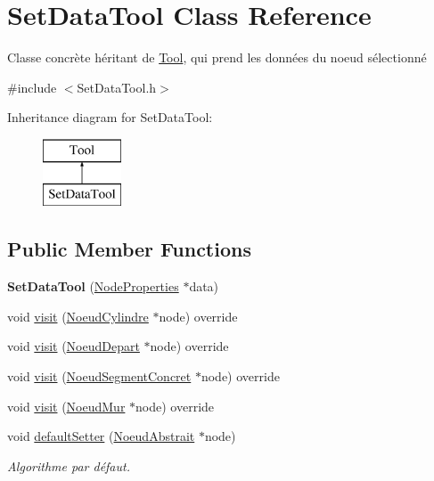 \hypertarget{class_set_data_tool}{}\section{Set\+Data\+Tool Class Reference}
\label{class_set_data_tool}


Classe concrète héritant de \hyperlink{class_tool}{Tool}, qui prend les données du noeud sélectionné  




{\ttfamily \#include $<$Set\+Data\+Tool.\+h$>$}

Inheritance diagram for Set\+Data\+Tool\+:\begin{figure}[H]
\begin{center}
\leavevmode
\includegraphics[height=2.000000cm]{class_set_data_tool}
\end{center}
\end{figure}
\subsection*{Public Member Functions}
\begin{DoxyCompactItemize}
\item 
\hypertarget{class_set_data_tool_af24195c8ec7c85e37f59f2bedd4c7431}{}{\bfseries Set\+Data\+Tool} (\hyperlink{struct_node_properties}{Node\+Properties} $\ast$data)\label{class_set_data_tool_af24195c8ec7c85e37f59f2bedd4c7431}

\item 
void \hyperlink{group__inf2990_gaab929a1ed9e3f6a2e80a15aef5de8f71}{visit} (\hyperlink{class_noeud_cylindre}{Noeud\+Cylindre} $\ast$node) override
\item 
void \hyperlink{group__inf2990_gabe996cec1a80bdb4a10383bf4716532d}{visit} (\hyperlink{class_noeud_depart}{Noeud\+Depart} $\ast$node) override
\item 
void \hyperlink{group__inf2990_ga5c1484b543077d2a267347edff94266c}{visit} (\hyperlink{class_noeud_segment_concret}{Noeud\+Segment\+Concret} $\ast$node) override
\item 
void \hyperlink{group__inf2990_ga5833b6797fd9a603bedd502431fc76cc}{visit} (\hyperlink{class_noeud_mur}{Noeud\+Mur} $\ast$node) override
\item 
\hypertarget{group__inf2990_ga410f169c9f53a3a018bce606e0ba9f23}{}void \hyperlink{group__inf2990_ga410f169c9f53a3a018bce606e0ba9f23}{default\+Setter} (\hyperlink{class_noeud_abstrait}{Noeud\+Abstrait} $\ast$node)\label{group__inf2990_ga410f169c9f53a3a018bce606e0ba9f23}

\begin{DoxyCompactList}\small\item\em Algorithme par défaut. \end{DoxyCompactList}\end{DoxyCompactItemize}


